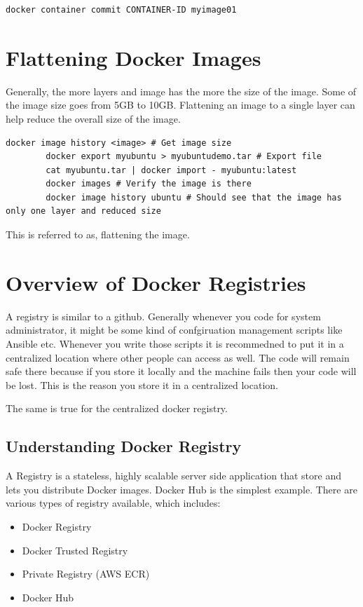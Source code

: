 \documentclass[11pt]{book}
\begin{document}
    \begin{lstlisting}[style=terminal]
        docker container commit CONTAINER-ID myimage01
    \end{lstlisting}

    \section{Flattening Docker Images}
    Generally, the more layers and image has the more the size of the image.
    Some of the image size goes from 5GB to 10GB.
    Flattening an image to a single layer can help reduce the overall size of the image.

    \begin{lstlisting}[style=terminal]
        docker image history <image> # Get image size
        docker export myubuntu > myubuntudemo.tar # Export file
        cat myubuntu.tar | docker import - myubuntu:latest
        docker images # Verify the image is there
        docker image history ubuntu # Should see that the image has only one layer and reduced size
    \end{lstlisting}

    This is referred to as, flattening the image.

    \section{Overview of Docker Registries}
    A registry is similar to a github.
    Generally whenever you code for system administrator, it might be some kind of confgiruation management scripts like Ansible etc.
    Whenever you write those scripts it is recommedned to put it in a centralized location where other people can access as well.
    The code will remain safe there because if you store it locally and the machine fails then your code will be lost.
    This is the reason you store it in a centralized location.

    The same is true for the centralized docker registry.

    \subsection{Understanding Docker Registry}
    A Registry is a stateless, highly scalable server side application that store and lets you distribute Docker images.
    Docker Hub is the simplest example.
    There are various types of registry available, which includes:

    \begin{itemize}
        \item Docker Registry
        \item Docker Trusted Registry
        \item Private Registry (AWS ECR)
        \item Docker Hub
    \end{itemize}
\end{document}
